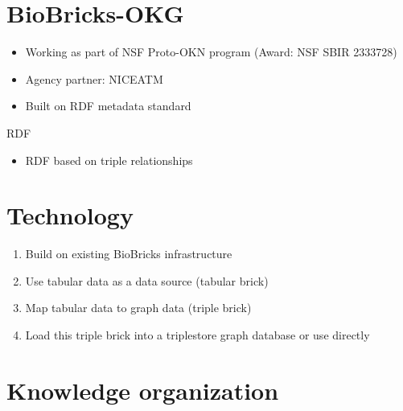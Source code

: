 \documentclass{beamer}
\def\labelenumi{\theenumi}
\begin{document}
\section{BioBricks-OKG}
\begin{frame}{\secname}
	\begin{itemize}
		\item Working as part of NSF Proto-OKN program (Award: NSF SBIR 2333728)
		\pause
		\item Agency partner: NICEATM
		\pause
		\item Built on RDF metadata standard
	\end{itemize}
\end{frame}

\begin{frame}[fragile]{RDF}
  \begin{itemize}
  \item RDF based on triple relationships
  \end{itemize}
  \begin{figure}[tbp]
   \centering
   \resizebox{0.4\textwidth}{!}{}
  \label{fig:rdf}
  \end{figure}
\end{frame}

\section{Technology}
\begin{frame}{\secname}
  \begin{enumerate}
  \def\labelenumi{\arabic{enumi}.}
  \item Build on existing BioBricks infrastructure
  \item Use tabular data as a data source (tabular brick)
  \item Map tabular data to graph data (triple brick)
  \item Load this triple brick into a triplestore
  graph database or use directly
  \end{enumerate}
\end{frame}

\section{Knowledge organization}
\begin{frame}[fragile]{\secname}
        \begin{figure}[tbp]%
        \centering%
        \end{figure}
\end{frame}
\end{document}
